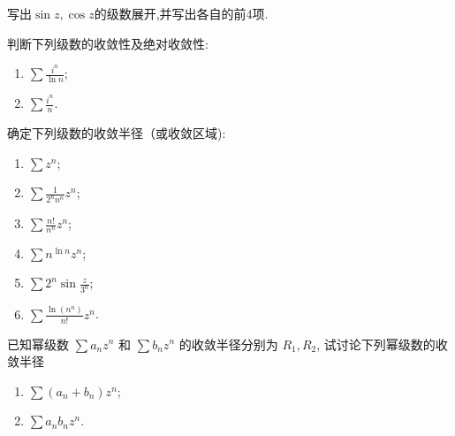 \documentclass[10pt]{article}
\newenvironment{problem}[2][]{\begin{trivlist}
\item[\hskip \labelsep {\bfseries #1}\hskip \labelsep {\bfseries #2}]}{\end{trivlist}}
\begin{document}
\begin{problem}{3.6}
  写出$\sin{z},\cos{z}$的级数展开,并写出各自的前4项.
  \end{problem}
  



\begin{problem}{3.7}
  判断下列级数的收敛性及绝对收敛性:
  \begin{enumerate}
    \item $\sum \frac{i^n}{\ln n}$;
    \item $\sum \frac{i^n}{n}$.
  \end{enumerate}
\end{problem}

\begin{problem}{3.8}
  确定下列级数的收敛半径（或收敛区域):
  \begin{enumerate}
    \item $\sum z^n$;
    \item $\sum \frac{1}{2^n n^n} z^n$;
    \item $\sum \frac{n !}{n^n} z^n$;
    \item $\sum n^{\ln{n}} z^n$;
    \item $\sum 2^n \sin \frac{z}{3^n}$;
    \item $\sum \frac{\ln \left(n^n\right)}{n !} z^n$.
  \end{enumerate}

\end{problem}


\begin{problem}{3.9}
  已知幂级数 $\sum a_n z^n$ 和 $\sum b_n z^n$ 的收敛半径分别为 $R_1, R_2$, 
  试讨论下列幂级数的收敛半径
  \begin{enumerate}
    \item $\sum\left(a_n+b_n\right) z^n$;
    \item $\sum a_n b_n z^n$.
  \end{enumerate}
\end{problem}

\end{document}
